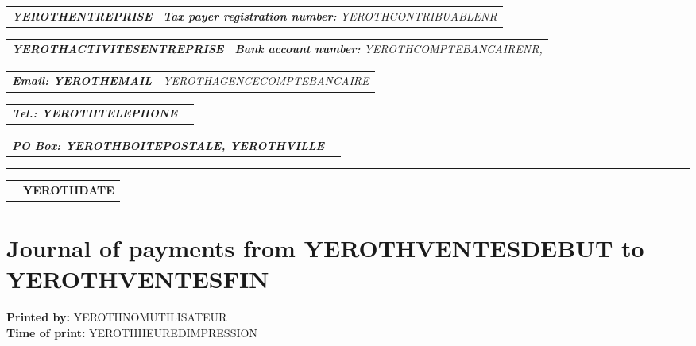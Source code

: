 \documentclass[16pt,YEROTHPAPERSPEC]{article} %
\makeatletter
\newcommand{\headerrow}[2]
{\begin{tabular*}{\linewidth}{l@{\extracolsep{\fill}}r}
	#1 &
	#2 \\
\end{tabular*}}
\newcommand{\emphbold}[1]{\textbf{\emph{#1}}\xspace}
\makeatother
\begin{document}
\bigskip

\headerrow
	{\emphbold{YEROTHENTREPRISE}}
	{\emph{\textbf{Tax payer registration number:} YEROTHCONTRIBUABLENR}}
\headerrow
	{\emphbold{YEROTHACTIVITESENTREPRISE}}
	{\emph{\textbf{Bank account number:} YEROTHCOMPTEBANCAIRENR,}}
\headerrow
	{\emphbold{Email: YEROTHEMAIL}}
	{\emph{YEROTHAGENCECOMPTEBANCAIRE}}
\headerrow
	{\emphbold{Tel.: YEROTHTELEPHONE}}
	{}
\headerrow
	{\emphbold{PO Box: YEROTHBOITEPOSTALE, YEROTHVILLE}}
	{}
	
\hrule

\headerrow
	{}
	{\textbf{YEROTHDATE}}

\section*{Journal of payments from YEROTHVENTESDEBUT to YEROTHVENTESFIN}

\textbf{Printed by:} YEROTHNOMUTILISATEUR\\
\textbf{Time of print:} YEROTHHEUREDIMPRESSION

\vspace{0.3cm}
\end{document}
